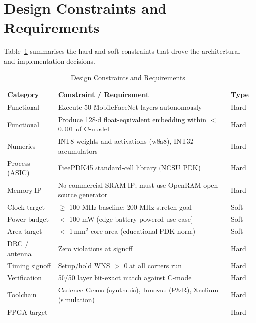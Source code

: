 \section{Design Constraints and Requirements}
\label{sec:constraints}

Table~\ref{tab:constraints} summarises the hard and soft constraints that drove the architectural and implementation decisions.

\begin{table}[H]
\centering
\caption{Design Constraints and Requirements}
\label{tab:constraints}
\begin{tabularx}{\textwidth}{lXl}
\toprule
\headrow \textbf{Category} & \textbf{Constraint / Requirement} & \textbf{Type} \\
\midrule
Functional       & Execute 50 MobileFaceNet layers autonomously                 & Hard \\
Functional       & Produce 128-d float-equivalent embedding within $<$0.001 of C-model & Hard \\
Numerics         & INT8 weights and activations (w8a8), INT32 accumulators       & Hard \\
Process (ASIC)   & FreePDK45 standard-cell library (NCSU PDK)                   & Hard \\
Memory IP        & No commercial SRAM IP; must use OpenRAM open-source generator & Hard \\
Clock target     & $\geq$ 100 MHz baseline; 200 MHz stretch goal                & Soft \\
Power budget     & $<$ 100 mW (edge battery-powered use case)                   & Soft \\
Area target      & $<$ 1\,mm$^2$ core area (educational-PDK norm)               & Soft \\
DRC / antenna    & Zero violations at signoff                                   & Hard \\
Timing signoff   & Setup/hold WNS $>$ 0 at all corners run                      & Hard \\
Verification     & 50/50 layer bit-exact match against C-model                  & Hard \\
Toolchain        & Cadence Genus (synthesis), Innovus (P\&R), Xcelium (simulation)& Hard \\
FPGA target      & & Hard \\
\bottomrule
\end{tabularx}
\end{table}

